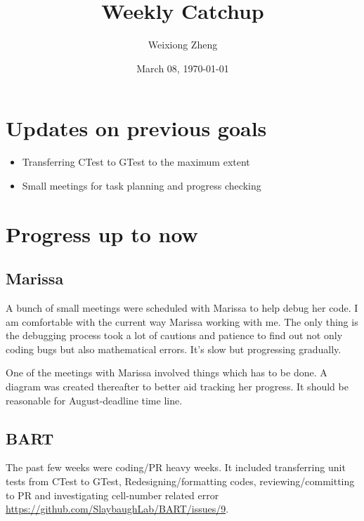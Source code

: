 \documentclass{article}
\title{Weekly Catchup} %
\author{Weixiong Zheng} %
\date{March 08, \today} %
\begin{document}
\maketitle %

\section{Updates on previous goals}
\begin{itemize}
	\item Transferring CTest to GTest to the maximum extent
	\item Small meetings for task planning and progress checking
\end{itemize}

\section{Progress up to now}
\subsection{Marissa}
A bunch of small meetings were scheduled with Marissa to help debug her code. I am comfortable
with the current way Marissa working with me. The only thing is the debugging process 
took a lot of cautions and patience to find out not only coding bugs but also mathematical
errors. It's slow but progressing gradually.

One of the meetings with Marissa involved things which has to be done. A diagram was created 
thereafter to better aid tracking her progress. It should be reasonable for August-deadline time line.

\subsection{BART}
The past few weeks were coding/PR heavy weeks. It included transferring unit tests from CTest to GTest, Redesigning/formatting codes, reviewing/committing to PR and investigating cell-number related error \url{https://github.com/SlaybaughLab/BART/issues/9}.
\end{document}
